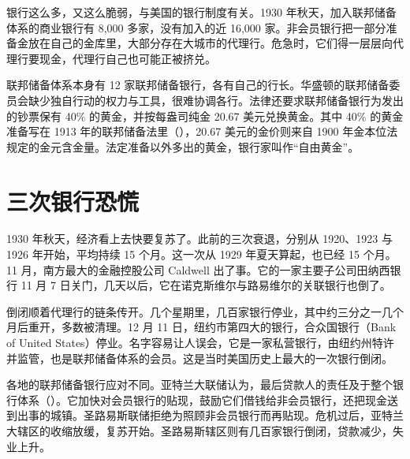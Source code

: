 
银行这么多，又这么脆弱，与美国的银行制度有关。1930 年秋天，加入联邦储备体系的商业银行有 8,000 多家，没有加入的近 16,000 家\cite{frhpanic1}。非会员银行把一部分准备金放在自己的金库里，大部分存在大城市的代理行。危急时，它们得一层层向代理行要现金，代理行自己也可能正被挤兑\cite{frhpanic1}。

联邦储备体系本身有 12 家联邦储备银行，各有自己的行长。华盛顿的联邦储备委员会缺少独自行动的权力与工具，很难协调各行\cite{frhgd}。法律还要求联邦储备银行为发出的钞票保有 40\% 的黄金，并按每盎司纯金 20.67 美元兑换黄金\cite{frhgold}。其中 40\% 的黄金准备写在 1913 年的联邦储备法里（），20.67 美元的金价则来自 1900 年金本位法规定的金元含金量\cite{frhgra}。法定准备以外多出的黄金，银行家叫作“自由黄金”\cite{frhgold}。

\section{三次银行恐慌}\label{sec:depressionus-panics}

1930 年秋天，经济看上去快要复苏了。此前的三次衰退，分别从 1920、1923 与 1926 年开始，平均持续 15 个月。这一次从 1929 年夏天算起，也已经 15 个月\cite{frhpanic1}。11 月，南方最大的金融控股公司 Caldwell 出了事。它的一家主要子公司田纳西银行 11 月 7 日关门，几天以后，它在诺克斯维尔与路易维尔的关联银行也倒了\cite{frhpanic1}。

倒闭顺着代理行的链条传开。几个星期里，几百家银行停业，其中约三分之一几个月后重开，多数被清理\cite{frhpanic1}。12 月 11 日，纽约市第四大的银行，合众国银行（Bank of United States）停业\cite{frhpanic1}。名字容易让人误会，它是一家私营银行，由纽约州特许并监管，也是联邦储备体系的会员\cite{bernanke1983,brr2011}。这是当时美国历史上最大的一次银行倒闭\cite{brr2011}。

各地的联邦储备银行应对不同。亚特兰大联储认为，最后贷款人的责任及于整个银行体系（）。它加快对会员银行的贴现，鼓励它们借钱给非会员银行，还把现金送到出事的城镇\cite{frhpanic1}。圣路易斯联储拒绝为照顾非会员银行而再贴现\cite{frhpanic1}。危机过后，亚特兰大辖区的收缩放缓，复苏开始。圣路易斯辖区则有几百家银行倒闭，贷款减少，失业上升\cite{frhpanic1}。

